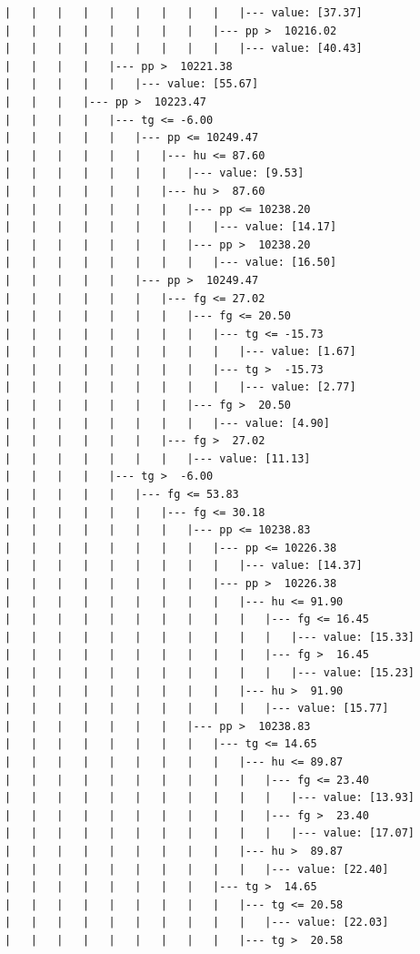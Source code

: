 \documentclass[UTF8, a4paper]{ctexart}
\begin{document}
\begin{lstlisting}
|   |   |   |   |   |   |   |   |   |--- value: [37.37]
|   |   |   |   |   |   |   |   |--- pp >  10216.02
|   |   |   |   |   |   |   |   |   |--- value: [40.43]
|   |   |   |   |--- pp >  10221.38
|   |   |   |   |   |--- value: [55.67]
|   |   |   |--- pp >  10223.47
|   |   |   |   |--- tg <= -6.00
|   |   |   |   |   |--- pp <= 10249.47
|   |   |   |   |   |   |--- hu <= 87.60
|   |   |   |   |   |   |   |--- value: [9.53]
|   |   |   |   |   |   |--- hu >  87.60
|   |   |   |   |   |   |   |--- pp <= 10238.20
|   |   |   |   |   |   |   |   |--- value: [14.17]
|   |   |   |   |   |   |   |--- pp >  10238.20
|   |   |   |   |   |   |   |   |--- value: [16.50]
|   |   |   |   |   |--- pp >  10249.47
|   |   |   |   |   |   |--- fg <= 27.02
|   |   |   |   |   |   |   |--- fg <= 20.50
|   |   |   |   |   |   |   |   |--- tg <= -15.73
|   |   |   |   |   |   |   |   |   |--- value: [1.67]
|   |   |   |   |   |   |   |   |--- tg >  -15.73
|   |   |   |   |   |   |   |   |   |--- value: [2.77]
|   |   |   |   |   |   |   |--- fg >  20.50
|   |   |   |   |   |   |   |   |--- value: [4.90]
|   |   |   |   |   |   |--- fg >  27.02
|   |   |   |   |   |   |   |--- value: [11.13]
|   |   |   |   |--- tg >  -6.00
|   |   |   |   |   |--- fg <= 53.83
|   |   |   |   |   |   |--- fg <= 30.18
|   |   |   |   |   |   |   |--- pp <= 10238.83
|   |   |   |   |   |   |   |   |--- pp <= 10226.38
|   |   |   |   |   |   |   |   |   |--- value: [14.37]
|   |   |   |   |   |   |   |   |--- pp >  10226.38
|   |   |   |   |   |   |   |   |   |--- hu <= 91.90
|   |   |   |   |   |   |   |   |   |   |--- fg <= 16.45
|   |   |   |   |   |   |   |   |   |   |   |--- value: [15.33]
|   |   |   |   |   |   |   |   |   |   |--- fg >  16.45
|   |   |   |   |   |   |   |   |   |   |   |--- value: [15.23]
|   |   |   |   |   |   |   |   |   |--- hu >  91.90
|   |   |   |   |   |   |   |   |   |   |--- value: [15.77]
|   |   |   |   |   |   |   |--- pp >  10238.83
|   |   |   |   |   |   |   |   |--- tg <= 14.65
|   |   |   |   |   |   |   |   |   |--- hu <= 89.87
|   |   |   |   |   |   |   |   |   |   |--- fg <= 23.40
|   |   |   |   |   |   |   |   |   |   |   |--- value: [13.93]
|   |   |   |   |   |   |   |   |   |   |--- fg >  23.40
|   |   |   |   |   |   |   |   |   |   |   |--- value: [17.07]
|   |   |   |   |   |   |   |   |   |--- hu >  89.87
|   |   |   |   |   |   |   |   |   |   |--- value: [22.40]
|   |   |   |   |   |   |   |   |--- tg >  14.65
|   |   |   |   |   |   |   |   |   |--- tg <= 20.58
|   |   |   |   |   |   |   |   |   |   |--- value: [22.03]
|   |   |   |   |   |   |   |   |   |--- tg >  20.58

\end{lstlisting}
\end{document}
